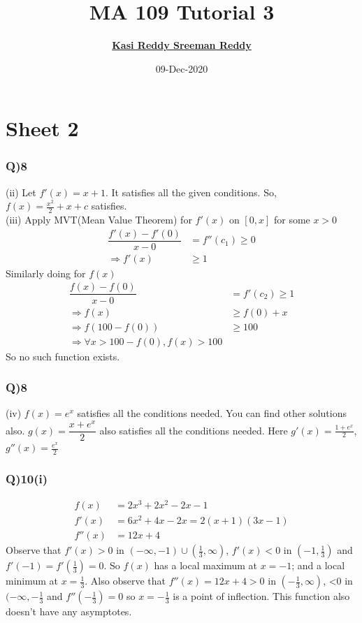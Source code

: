 \documentclass[11pt]{beamer}
\author[K. Sreeman Reddy]{\href{http://iamsreeman.github.io/}{\textbf{Kasi Reddy Sreeman Reddy}}\linebreak\text{2nd year physics student}\linebreak\text{\href{http://iamsreeman.github.io/MA109}{http://iamsreeman.github.io/MA109}}}
\title{MA 109 Tutorial 3}
\institute[]{IIT Bombay}
\date{09-Dec-2020}
\begin{document}
\begin{frame}
\titlepage
\end{frame}


\section{Sheet 2}
\begin{frame}
\frametitle{Q)8}
(ii) Let $f'(x)=x+1$. It satisfies all the given conditions. So, $f(x)=\frac{x^2}{2}+x+c$ satisfies.\\
(iii) Apply MVT(Mean Value Theorem) for $f'(x)$ on $[0,x]$ for some $x>0$
\begin{align*}
\dfrac{f'(x)-f'(0)}{x-0}&=f''(c_1)\geq 0\\
\Rightarrow f'(x)&\geq 1
\end{align*}
Similarly doing for $f(x)$
\begin{align*}
\dfrac{f(x)-f(0)}{x-0}&=f'(c_2)\geq 1\\
\Rightarrow f(x)&\geq f(0)+x\\
\Rightarrow f(100-f(0))&\geq 100\\
\Rightarrow \forall x >100-f(0), f(x)>100
\end{align*}
So no such function exists.
\end{frame}
\begin{frame}
\frametitle{Q)8}
(iv) $f(x)=e^x$ satisfies all the conditions needed. You can find other solutions also. $g(x)=\dfrac{x+e^x}{2}$ also satisfies all the conditions needed. Here $g'(x)=\frac{1+e^x}{2}$, $g''(x)=\frac{e^x}{2}$
\end{frame}
\begin{frame}
\frametitle{Q)10(i)}
\begin{align*}
f(x)&=2x^{3}+2x^{2}-2x-1\\
f'(x)&=6x^{2}+4x-2x=2(x+1)(3x-1)\\
f''(x)&=12x+4
\end{align*}
Observe that $f'(x)>0$ in $(-\infty,-1)\cup (\frac{1}{3},\infty)$, $f'(x)<0$ in $(-1,\frac{1}{3})$ and $f'(-1)=f'(\frac{1}{3})=0$. So $f(x)$ has a local maximum at $x = -1$; and a local minimum at $x =\frac{1}{3}$. Also observe that $f''(x) = 12x + 4>0$ in $(-\frac{1}{3},\infty)$, <0 in $(-\infty,-\frac{1}{3}$ and $f''(-\frac{1}{3})=0$ so $x=-\frac{1}{3}$ is a point of inflection. This function also doesn't have any asymptotes.
\end{frame}
\end{document}
